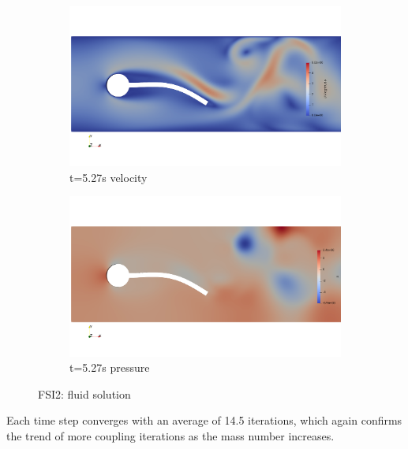 \begin{figure}[htb]
\begin{subfigure}{0.5\textwidth}
  \includegraphics[width=\linewidth, trim=0 120 0 120, clip]{images/FSI2/fsi2_v3.png}
  \caption{t=5.27s velocity}
  \label{fig:fsi2_v3}
\end{subfigure}\hfil %
\begin{subfigure}{0.5\textwidth}
  \includegraphics[width=\linewidth, trim=0 120 0 120, clip]{images/FSI2/fsi2_p3.png}
  \caption{t=5.27s pressure}
  \label{fig:fsi2_p3}
\end{subfigure}\hfil %

\caption{FSI2: fluid solution}
\label{fig:FSI2_sol}
\end{figure}


Each time step converges with an average of 14.5 iterations, which again confirms the trend of more coupling iterations as the mass number increases.

